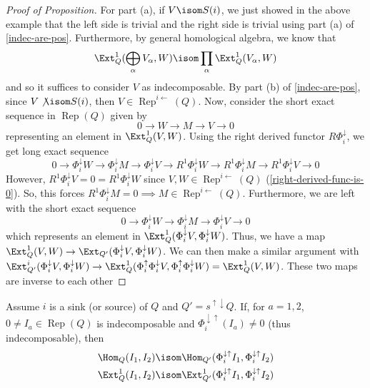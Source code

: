 \documentclass[11pt,leqno,oneside]{amsbook}
\numberwithin{thm}{section}
\newcommand{\Rep}{\operatorname{Rep}} %
\renewcommand{\Q}{Q} %
\newcommand{\sinksource}{s^{\uparrow \downarrow}} %
\newcommand{\sinktosourcefunc}{\Phi^\downarrow} %
\newcommand{\sourcetosinkfunc}{\Phi^\uparrow} %
\newcommand{\sinksourcefunc}{\Phi^{\downarrow \uparrow}} %
\begin{document}
\begin{proof}[Proof of Proposition]
  For part (a), if \(V \isom S(i)\), we just showed in the above
  example that the left side is trivial and the right side is trivial
  using part (a) of 
  \ref{indec-are-pos}. Furthermore, by general homological algebra, we
  know that \[ 
    \Ext_\Q^1(\bigoplus_{\alpha} V_\alpha, W) \isom \prod_{\alpha}
    \Ext_\Q^1(V_\alpha, W)
  \]
  and so it suffices to consider \(V\) as indecomposable. By part (b)
  of \ref{indec-are-pos}, since \(V \not \isom S(i)\), then \(V \in
  \Rep^{i \leftarrow}(\Q)\). Now, consider the short exact sequence in
  \(\Rep(\Q)\) given by \[
    0 \to W \to M \to V \to 0
  \]
  representing an element in \(\Ext_\Q^1(V,W)\). Using the right
  derived functor \(R\sinktosourcefunc_i\), we get long exact
  sequence \[
    0 \to \sinktosourcefunc_i W \to \sinktosourcefunc_i M \to
    \sinktosourcefunc_i V \to R^1 \sinktosourcefunc_i W \to
    R^1 \sinktosourcefunc_i M \to R^1 \sinktosourcefunc_i V \to 0
  \]
  However, \(R^1 \sinktosourcefunc_i V = 0 = R^1 \sinktosourcefunc_i
  W\) since \(V,W \in \Rep^{i
      \leftarrow}(\Q)\) (\ref{right-derived-func-is-0}). So, this forces
    \(R^1 \sinktosourcefunc_i M = 0 
  \implies M \in \Rep^{i \leftarrow}(\Q)\). Furthermore, we are left
  with the short exact sequence \[
    0 \to \sinktosourcefunc_i W \to \sinktosourcefunc_i M \to
    \sinktosourcefunc_i V \to 0
  \]
  which represents an element in \(\Ext_\Q^1(\sinktosourcefunc_i V,
  \sinktosourcefunc_i W)\). Thus, we have a map \(\Ext_\Q^1(V,W) \to
  \Ext_{\Q'}(\sinktosourcefunc_i V, \sinktosourcefunc_i W)\). We can
  then make a similar argument with \(\Ext_{\Q'}^i(\sinktosourcefunc_i
  V, \sinktosourcefunc_i W) \to \Ext_{\Q}^1(\sourcetosinkfunc_i \sinktosourcefunc_i
  V, \sourcetosinkfunc_i \sinktosourcefunc_i W) =
  \Ext_Q^1(V,W)\). These two maps are inverse to each other
\end{proof}
\begin{prop}
  Assume \(i\) is a sink (or source) of \(\Q\) and \(\Q' = \sinksource
  \Q\). If, for \(a=1,2\), \(0 \neq I_a \in
  \Rep(\Q)\) is indecomposable and \(\sinksourcefunc_i(I_a) \neq 0\) (thus
  indecomposable), then
  \begin{align*}
    \Hom_\Q(I_1,I_2) \isom \Hom_{\Q'}(\sinksourcefunc_i I_1,
    \sinksourcefunc_i I_2) \\
    \Ext_\Q^1(I_1, I_2) \isom \Ext_{\Q'}^1(\sinksourcefunc_i I_1,
    \sinksourcefunc_i I_2)
  \end{align*}
\end{prop}
\end{document}

